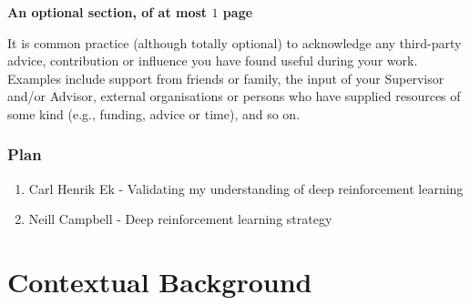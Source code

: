 \documentclass[ %
                    author={Callum Pearce},
                supervisor={Dr. Neill Campbell},
                    degree={MEng},
                     title={How effective are Temporal difference learning methods for reducing the number of zero contribution light paths while still accurately approximating Global Illumination in Path tracing?},
                  subtitle={},
                      type={research},
                      year={2019} ]{dissertation}
\begin{document}
{\bf An optional section, of at most $1$ page}
\vspace{1cm} 

\noindent
It is common practice (although totally optional) to acknowledge any
third-party advice, contribution or influence you have found useful
during your work.  Examples include support from friends or family, 
the input of your Supervisor and/or Advisor, external organisations 
or persons who  have supplied resources of some kind (e.g., funding, 
advice or time), and so on.

\subsection{Plan}
\begin{enumerate}
\item Carl Henrik Ek - Validating my understanding of deep reinforcement learning
\item Neill Campbell - Deep reinforcement learning strategy
\end{enumerate}


%

\mainmatter


\chapter{Contextual Background}
\label{chap:context}
\end{document}
